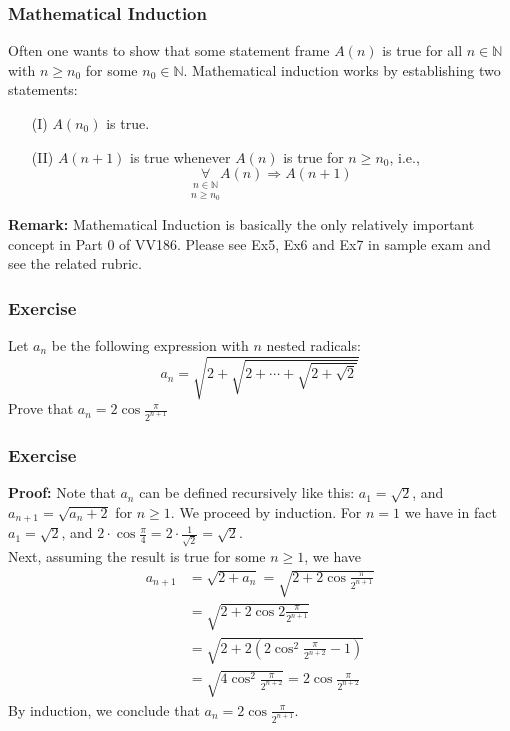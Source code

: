 \documentclass{beamer}
\begin{document}
\begin{frame}
    \frametitle{Mathematical Induction}
    \hspace{1em}Often one wants to show that some statement frame $A(n)$ is true for 
    all $n \in \mathbb{N}$ with $n\geq n_0 $ for some $n_0\in \mathbb{N}$. 
    Mathematical induction works by establishing two statements:
    \begin{itemize}
        \item[(I)] $A(n_0)$ is true.
        \item[(II)] $A(n+1)$ is true whenever $A(n)$ is true for $n\geq n_0$, i.e.,
        $$\underset{n\geq n_0}{\underset{n\in \mathbb{N}}{\forall}} A(n)\Rightarrow A(n+1)$$ 
    \end{itemize}
    \textbf{Remark:} Mathematical Induction is basically the only relatively important
    concept in Part 0 of VV186. Please see Ex5, Ex6 and Ex7 in sample exam and see
    the related rubric.
    

\end{frame}
\begin{frame}
    \frametitle{Exercise}
    Let $ a_n$ be the following expression with $n$ nested radicals:\
    $$a_n=\sqrt{2+\sqrt{2+\cdots+\sqrt{2+\sqrt{2}}}}$$
    Prove that $a_n = 2 \cos \frac{\pi}{2^{n+1}}$
\end{frame}
\begin{frame}
    \frametitle{Exercise}
    \textbf{Proof:} Note that $a_n$ can be defined recursively like this: $a_1 =\sqrt{2}$, and
    $a_{n+1} =\sqrt{a_n+2}$ for $n \geq 1$. We proceed by induction. For $n = 1$ we have in fact
    $a_1=\sqrt{2}$, and $2\cdot \cos \frac{\pi}{4}= 2\cdot \frac{1}{\sqrt{2}}=\sqrt{2}$.\\ 
    \vspace{1em}
    Next, assuming the result is true for some $n \geq 1$, we have
    \begin{align*}
        a_{n+1}&=\sqrt{2+a_n}=\sqrt{2+2\cos \frac{\pi}{2^{n+1}}}\\
               &=\sqrt{2+2\cos 2\frac{\pi}{2^{n+1}}}\\
               &=\sqrt{2+2(2\cos^2\frac{\pi}{2^{n+2}}-1)}\\
               &=\sqrt{4\cos ^2\frac{\pi}{2^{n+2}}}
               =2\cos \frac{\pi}{2^{n+2}}
    \end{align*}
    By  induction, we conclude that $a_n = 2 \cos \frac{\pi}{2^{n+1}}$.
\end{frame}
\end{document}

